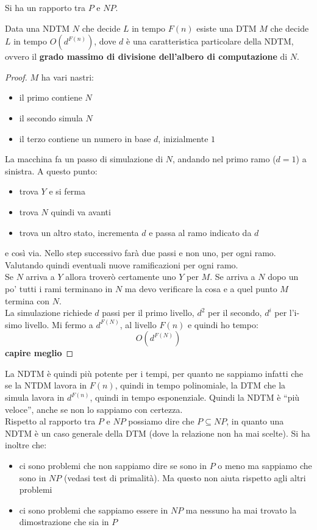 \documentclass[a4paper,12pt, oneside]{book}
\begin{document}
Si ha un rapporto tra $P$ e $NP$.
\begin{teorema}
  Data una NDTM $N$ che decide $L$ in tempo $F(n)$ esiste una DTM $M$ che decide
  $L$ in tempo $O(d^{F(n)})$, dove $d$ è una caratteristica particolare della
  NDTM, ovvero il \textbf{grado massimo di divisione dell'albero di
    computazione} di $N$. 
\end{teorema}
\begin{proof}
  $M$ ha vari nastri:
  \begin{itemize}
    \item il primo contiene $N$
    \item il secondo simula $N$
    \item il terzo contiene un numero in base $d$, inizialmente $1$
  \end{itemize}
  La macchina fa un passo di simulazione di $N$, andando nel primo ramo ($d=1$)
  a sinistra. A questo punto:
  \begin{itemize}
    \item trova $Y$ e si ferma
    \item trova $N$ quindi va avanti
    \item trova un altro stato, incrementa $d$ e passa al ramo indicato da
    $d$
  \end{itemize}
  e così via. Nello step successivo farà due passi e non uno, per ogni
  ramo. Valutando quindi eventuali nuove ramificazioni per ogni ramo. \\
  Se $N$ arriva a $Y$ allora troverò certamente uno $Y$ per $M$. Se arriva a $N$
  dopo un po' tutti i rami terminano in $N$ ma devo verificare la cosa e a quel
  punto $M$ termina con $N$.\\
  La simulazione richiede $d$ passi per il primo livello, $d^2$ per il secondo,
  $d^i$ per l'i-simo livello. Mi fermo a $d^{F(N)}$, al livello $F(n)$ e quindi
  ho tempo: 
  \[O(d^{F(N)})\]
  \textbf{capire meglio}
\end{proof}
La NDTM è quindi più potente per i tempi, per quanto ne sappiamo infatti che se
la NTDM lavora in $F(n)$, quindi in tempo polinomiale, la DTM che la simula
lavora in $d^{F(n)}$, quindi in tempo esponenziale. Quindi la NDTM è ``più
veloce'', anche se non lo sappiamo con certezza.\\
Rispetto al rapporto tra $P$ e $NP$ possiamo dire che $P\subseteq NP$, in quanto
una NDTM è un caso generale della DTM (dove la relazione non ha mai scelte). Si
ha inoltre che: 
\begin{itemize}
  \item ci sono problemi che non sappiamo dire se sono in $P$ o meno ma sappiamo
  che sono in $NP$ (vedasi test di primalità). Ma questo non aiuta rispetto agli
  altri problemi
  \item ci sono problemi che sappiamo essere in $NP$ ma nessuno ha mai trovato
  la dimostrazione che sia in $P$
\end{itemize}
\end{document}
